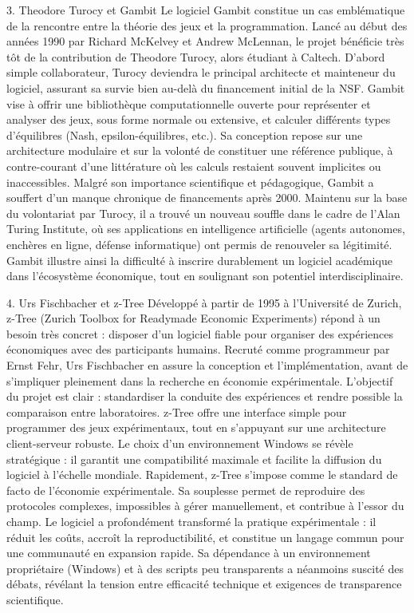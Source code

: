 3. Theodore Turocy et Gambit
Le logiciel Gambit constitue un cas emblématique de la rencontre entre la théorie des jeux et la programmation. Lancé au début des années 1990 par Richard McKelvey et Andrew McLennan, le projet bénéficie très tôt de la contribution de Theodore Turocy, alors étudiant à Caltech. D’abord simple collaborateur, Turocy deviendra le principal architecte et mainteneur du logiciel, assurant sa survie bien au-delà du financement initial de la NSF.
Gambit vise à offrir une bibliothèque computationnelle ouverte pour représenter et analyser des jeux, sous forme normale ou extensive, et calculer différents types d’équilibres (Nash, epsilon-équilibres, etc.). Sa conception repose sur une architecture modulaire et sur la volonté de constituer une référence publique, à contre-courant d’une littérature où les calculs restaient souvent implicites ou inaccessibles.
Malgré son importance scientifique et pédagogique, Gambit a souffert d’un manque chronique de financements après 2000. Maintenu sur la base du volontariat par Turocy, il a trouvé un nouveau souffle dans le cadre de l’Alan Turing Institute, où ses applications en intelligence artificielle (agents autonomes, enchères en ligne, défense informatique) ont permis de renouveler sa légitimité. Gambit illustre ainsi la difficulté à inscrire durablement un logiciel académique dans l’écosystème économique, tout en soulignant son potentiel interdisciplinaire.

4. Urs Fischbacher et z-Tree
Développé à partir de 1995 à l’Université de Zurich, z-Tree (Zurich Toolbox for Readymade Economic Experiments) répond à un besoin très concret : disposer d’un logiciel fiable pour organiser des expériences économiques avec des participants humains. Recruté comme programmeur par Ernst Fehr, Urs Fischbacher en assure la conception et l’implémentation, avant de s’impliquer pleinement dans la recherche en économie expérimentale.
L’objectif du projet est clair : standardiser la conduite des expériences et rendre possible la comparaison entre laboratoires. z-Tree offre une interface simple pour programmer des jeux expérimentaux, tout en s’appuyant sur une architecture client-serveur robuste. Le choix d’un environnement Windows se révèle stratégique : il garantit une compatibilité maximale et facilite la diffusion du logiciel à l’échelle mondiale.
Rapidement, z-Tree s’impose comme le standard de facto de l’économie expérimentale. Sa souplesse permet de reproduire des protocoles complexes, impossibles à gérer manuellement, et contribue à l’essor du champ. Le logiciel a profondément transformé la pratique expérimentale : il réduit les coûts, accroît la reproductibilité, et constitue un langage commun pour une communauté en expansion rapide. Sa dépendance à un environnement propriétaire (Windows) et à des scripts peu transparents a néanmoins suscité des débats, révélant la tension entre efficacité technique et exigences de transparence scientifique.


